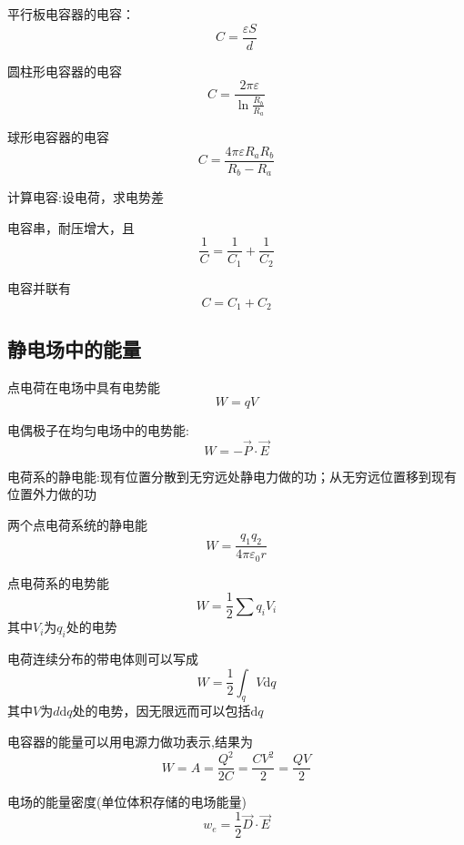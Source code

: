 \documentclass[10pt,a4paper]{article}
\begin{document}
平行板电容器的电容：
\[\boxed{C=\frac{\varepsilon S}{d}}\]

圆柱形电容器的电容
\[C=\frac{2\pi\varepsilon}{\ln  \frac{R_b}{R_a}}\]

球形电容器的电容
\[C=\frac{4\pi\varepsilon R_aR_b}{R_b-R_a}\]

计算电容:设电荷，求电势差

电容串，耐压增大，且
\[\frac{1}{C}=\frac{1}{C_1}+\frac{1}{C_2}\]

电容并联有
\[C=C_1+C_2\]

\subsection{静电场中的能量}
点电荷在电场中具有电势能
\[W=qV\]

电偶极子在均匀电场中的电势能:
\[W=-\vec{P}\cdot\vec{E}\]

电荷系的静电能:现有位置分散到无穷远处静电力做的功；从无穷远位置移到现有位置外力做的功

两个点电荷系统的静电能
\[W=\frac{q_1q_2}{4\pi\varepsilon_0r}\]

点电荷系的电势能
\[W=\frac{1}{2}\sum q_iV_i\]
其中$V_i$为$q_i$处的电势

电荷连续分布的带电体则可以写成
\[W=\frac{1}{2}\int_q V\mathrm{d}q\]
其中$V$为$d\mathrm{d}q$处的电势，因无限远而可以包括$\mathrm{d}q$

电容器的能量可以用电源力做功表示,结果为\[W=A=\frac{Q^2}{2C}=\frac{CV^2}{2}=\frac{QV}{2}\]

电场的能量密度(单位体积存储的电场能量)
\[w_e=\frac{1}{2}\vec{D}\cdot\vec{E}\]
\end{document}

